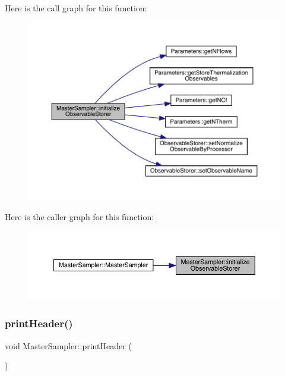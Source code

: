 Here is the call graph for this function\+:
\nopagebreak
\begin{figure}[H]
\begin{center}
\leavevmode
\includegraphics[width=350pt]{class_master_sampler_a88e2eec68ea6bd60cc3f375ac04a8ded_cgraph}
\end{center}
\end{figure}
Here is the caller graph for this function\+:
\nopagebreak
\begin{figure}[H]
\begin{center}
\leavevmode
\includegraphics[width=350pt]{class_master_sampler_a88e2eec68ea6bd60cc3f375ac04a8ded_icgraph}
\end{center}
\end{figure}
\mbox{\label{class_master_sampler_a51b207672764c100e1ae258fd2e33fcf}} 
\subsubsection{\texorpdfstring{printHeader()}{printHeader()}}
{\footnotesize\ttfamily void Master\+Sampler\+::print\+Header (\begin{DoxyParamCaption}{ }\end{DoxyParamCaption})\hspace{0.3cm}{\ttfamily [virtual]}}



